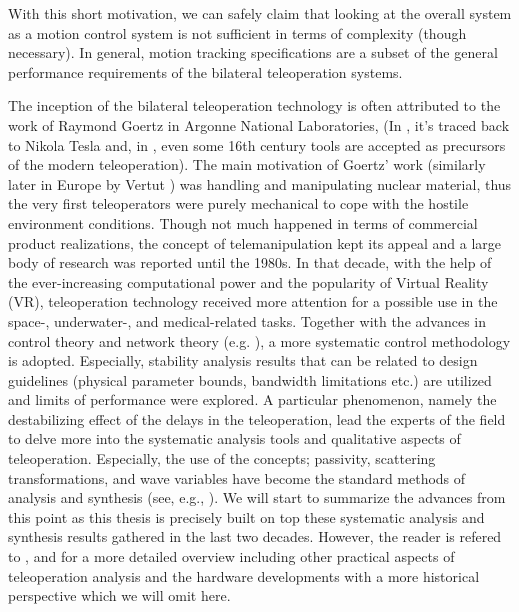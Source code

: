 With this short motivation, we can safely claim that looking at the overall system as a motion control 
system is not sufficient in terms of complexity (though necessary). In general, motion tracking specifications 
are a subset of the general performance requirements of the bilateral teleoperation systems. 



The inception of the bilateral teleoperation technology is often attributed to the work 
of Raymond Goertz in Argonne National Laboratories, \cite{goertz} (In \cite{basanezsuarez}, 
it's traced back to Nikola Tesla and, in \cite{sheridan89}, even some 16th century tools are accepted as precursors 
of the modern teleoperation). The main motivation of Goertz' work (similarly later in Europe 
by Vertut \cite{vertutcoiffet}) was handling and manipulating nuclear material, thus the very 
first teleoperators were purely mechanical to cope with the hostile environment conditions. Though not much 
happened in terms of commercial product realizations, the concept of telemanipulation kept its appeal 
and a large body of research was reported until the 1980s. In that decade, with the help of the 
ever-increasing computational power and the popularity of Virtual Reality (VR), teleoperation 
technology received more attention for a possible use in the space-, underwater-, and medical-related 
tasks. Together with the advances in control theory and network theory (e.g. \cite{miyazaki,furuta}), 
a more systematic control methodology is adopted. Especially, stability analysis results that can be 
related to design guidelines (physical parameter bounds, bandwidth limitations etc.) are utilized
and limits of performance were explored. A particular phenomenon, namely the destabilizing effect 
of the delays in the teleoperation, lead the experts of the field to delve more into the systematic 
analysis tools and qualitative aspects of teleoperation. Especially, the use of the concepts; passivity, 
scattering transformations, and wave variables have become the standard methods of analysis and synthesis
(see, e.g., \cite{hannaford89,andersonspong,nieslotine}). We will start to summarize the advances from this 
point as this thesis is precisely built on top these systematic analysis and synthesis results gathered in 
the last two decades. However, the reader is refered to \cite{hokayemspong,burdea}, 
and \cite{sheridan89} for a more detailed overview including other practical aspects of teleoperation analysis and 
the hardware developments with a more historical perspective which we will omit here. 


